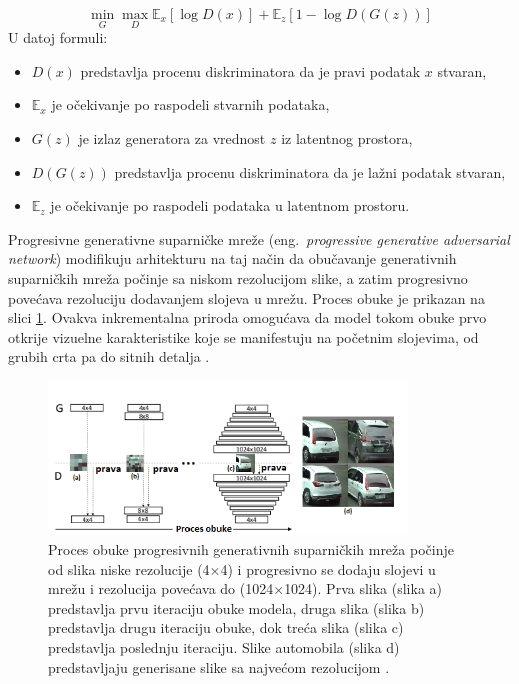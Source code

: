 \documentclass[12pt,oneside]{memoir}
\begin{document}
\begin{equation}
   \min_{G}\max_{D}\mathbb{E}_{x}[\log{D(x)}] +  \mathbb{E}_{z}[1 - \log{D(G(z))}]
\end{equation}
U datoj formuli:
\begin{itemize}
    \item $D(x)$ predstavlja procenu diskriminatora da je pravi podatak $x$ stvaran,
    \item $\mathbb{E}_{x}$ je očekivanje po raspodeli stvarnih podataka,
    \item $G(z)$ je izlaz generatora za vrednost $z$ iz latentnog prostora,
    \item $D(G(z))$ predstavlja procenu diskriminatora da je lažni podatak stvaran,
    \item $\mathbb{E}_{z}$ je očekivanje po raspodeli podataka u latentnom prostoru.
\end{itemize}


Progresivne generativne suparničke mreže (eng.~\textit{progressive generative adversarial network}) modifikuju arhitekturu na taj način da obučavanje generativnih suparničkih mreža počinje sa niskom rezolucijom slike, a zatim progresivno povećava rezoluciju dodavanjem slojeva u mrežu. Proces obuke je prikazan na slici \ref{fig:section2_augmentation_progressivegans}.
Ovakva inkrementalna priroda omogućava da model tokom obuke prvo otkrije vizuelne karakteristike koje se manifestuju na početnim slojevima, od grubih crta pa do sitnih detalja \cite{karras2017progressive}.


\begin{figure}[ht]
    \centering
    \includegraphics[width=0.85\textwidth]{matfmaster/glava2/progressive_gan.png}
    \caption{Proces obuke progresivnih generativnih suparničkih mreža počinje od slika niske rezolucije (4\(\times\)4) i progresivno se dodaju slojevi u mrežu i rezolucija povećava do (1024\(\times\)1024). Prva slika (slika a) predstavlja prvu iteraciju obuke modela, druga slika (slika b) predstavlja drugu iteraciju obuke, dok treća slika (slika c) predstavlja poslednju iteraciju. Slike automobila (slika d) predstavljaju generisane slike sa najvećom rezolucijom \cite{karras2017progressive}. }
    \label{fig:section2_augmentation_progressivegans}
\end{figure}
\end{document}
